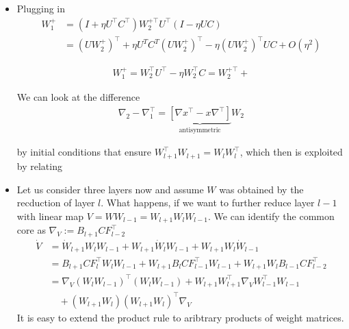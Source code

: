 \documentclass{article}
\begin{document}
\begin{itemize}
\item Plugging in 
\begin{align}
W_1^{+} & =  (I+\eta U^\top C^\top) W_2^{+\top} U^\top (I - \eta UC) \\
& = (U W_2^{+})^\top+ \eta U^T C^T (U W_2^{+})^\top - \eta (U W_2^{+})^\top UC + O(\eta^2)
\end{align}

\begin{align}
W_1^+ = W_2^\top U^\top  - \eta W_2^\top  C = W_2^{+\top} + 
\end{align}
\newpage


We can look at the difference 
\begin{align}
\nabla_2 - \nabla_1^\top = \underbrace{[ \nabla x^\top - x \nabla^\top ]}_{\text{antisymmetric}} W_2
\end{align}




\newpage
by initial conditions that ensure $W_{l+1}^\top W_{l+1} = W_l W_l^\top$, which then is exploited by relating

\item Let us consider three layers now and assume $W$ was obtained by the recduction of layer $l$. What happens, if we want to further reduce layer $l-1$ with linear map  $V = W W_{l-1} = W_{l+1} W_{l} W_{l-1}$.  We can identify the common core as $\nabla_V := B_{l+1} C F_{l-2}^\top$
\begin{align}
\dot V & = \dot W_{l+1} W_l W_{l-1} + W_{l+1} \dot W_l W_{l-1} + W_{l+1} W_l \dot W_{l-1} \\
& = B_{l+1} C F_l^\top W_l W_{l-1} + W_{l+1} B_l C F_{l-1}^\top W_{l-1}  + W_{l+1} W_l B_{l-1} C F_{l-2}^\top \\
& = \nabla_V (W_l W_{l-1})^\top (W_l W_{l-1}) + W_{l+1} W_{l+1}^\top \nabla_V  W_{l-1}^\top W_{l-1}  \\ 
& \quad + (W_{l+1} W_l) (W_{l+1} W_l)^\top \nabla_V  
\end{align}
It is easy to extend the product rule to aribtrary products of weight matrices. 
\newpage


\end{itemize}
\end{document}
